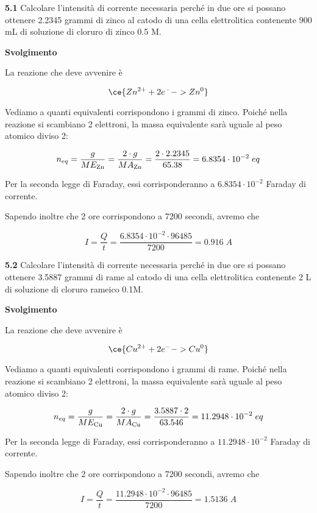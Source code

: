 \textbf{5.1} Calcolare l'intensità di corrente necessaria perché in due ore si possano ottenere 2.2345 grammi di zinco al catodo di una cella elettrolitica contenente 900 mL di soluzione di cloruro di zinco 0.5 M.

\vspace{0.2cm}\large\textbf{Svolgimento}\normalsize

\vspace{0.2cm}La reazione che deve avvenire è

$$\ce{Zn^{2+} + 2e^- -> Zn^{0}}$$

Vediamo a quanti equivalenti corrispondono i grammi di zinco. Poiché nella reazione si scambiano 2 elettroni, la massa equivalente sarà uguale al peso atomico diviso 2:

$$n_{eq}=\frac{g}{ME_{\rm Zn}}=\frac{2 \cdot g}{MA_{\rm Zn}}
=\frac{2 \cdot 2.2345}{65.38}
=6.8354 \cdot 10^{-2}\;eq$$

Per la seconda legge di Faraday, essi corrisponderanno a $6.8354 \cdot 10^{-2}$ Faraday di corrente.

Sapendo inoltre che 2 ore corrispondono a 7200 secondi, avremo che

$$I=\frac{Q}{t}
=\frac{6.8354 \cdot 10^{-2} \cdot 96485}{7200}=0.916\;A$$

\vspace{0.2cm}\textbf{5.2} Calcolare l'intensità di corrente necessaria perché in due ore si possano ottenere 3.5887 grammi di rame al catodo di una cella elettrolitica contenente 2 L di soluzione di cloruro rameico 0.1M.

\vspace{0.2cm}\large\textbf{Svolgimento}\normalsize

\vspace{0.2cm}La reazione che deve avvenire è

$$\ce{Cu^{2+} + 2e^- -> Cu^{0}}$$

Vediamo a quanti equivalenti corrispondono i grammi di rame. Poiché nella reazione si scambiano 2 elettroni, la massa equivalente sarà uguale al peso atomico diviso 2:

$$n_{eq}=\frac{g}{ME_{\rm Cu}}=\frac{2 \cdot g}{MA_{\rm Cu}}
=\frac{3.5887 \cdot 2}{63.546}
=11.2948 \cdot 10^{-2}\;eq$$

Per la seconda legge di Faraday, essi corrisponderanno a $11.2948 \cdot 10^{-2}$ Faraday di corrente.

Sapendo inoltre che 2 ore corrispondono a 7200 secondi, avremo che

$$I=\frac{Q}{t}
=\frac{11.2948 \cdot 10^{-2} \cdot 96485}{7200}=1.5136\;A$$

